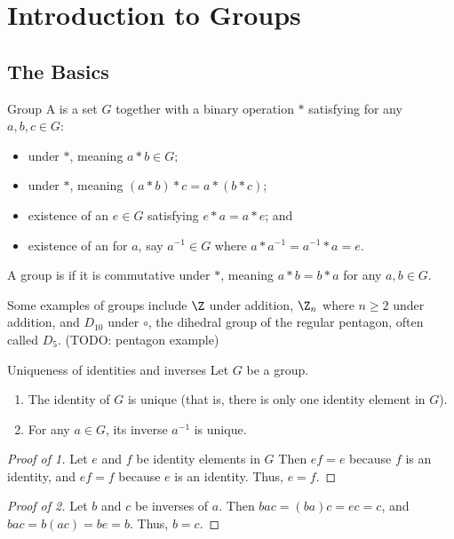 \chapter{Introduction to Groups}

\section{The Basics}

\begin{dfnbox}{Group}{}
    A  is a set $G$ together with a binary operation $*$ satisfying for any $a,b,c \in G$:
    \begin{itemize}
        \item {} under $*$, meaning $a * b \in G$;
        \item {} under $*$, meaning $(a * b) * c = a * (b * c)$;
        \item existence of an  $e \in G$ satisfying $e * a = a * e$; and
        \item existence of an  for $a$, say $a^{-1} \in G$ where $a * a^{-1} = a^{-1} * a = e$.
    \end{itemize}
    A group is  if it is commutative under $*$, meaning $a * b = b * a$ for any $a,b \in G$.
\end{dfnbox}

Some examples of groups include $\Z$ under addition, $\Z_n$ where $n \geq 2$ under addition, and $D_{10}$ under $\circ$, the dihedral group of the regular pentagon, often called $D_5$. (TODO: pentagon example)

\begin{thmbox}{Uniqueness of identities and inverses}{}
    Let $G$ be a group.
    \begin{enumerate}
        \item The identity of $G$ is unique (that is, there is only one identity element in $G$).
        \item For any $a \in G$, its inverse $a^{-1}$ is unique.
    \end{enumerate}
    \tcblower
    \begin{proof}[Proof of 1]
        Let $e$ and $f$ be identity elements in $G$ Then $ef = e$ because $f$ is an identity, and $ef = f$ because $e$ is an identity. Thus, $e = f$.
    \end{proof}

    \begin{proof}[Proof of 2]
        Let $b$ and $c$ be inverses of $a$. Then $bac = (ba)c = ec = c$, and $bac = b(ac) = be = b$. Thus, $b = c$.
    \end{proof}
\end{thmbox}


